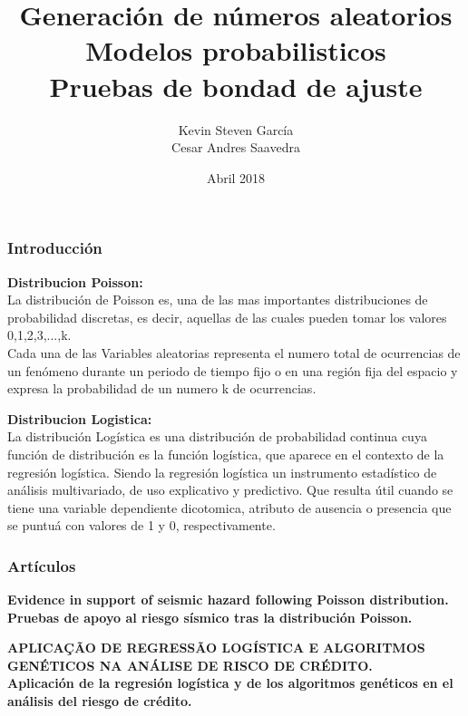 \documentclass[12pt]{beamer}
\author{Kevin Steven García \\ Cesar Andres Saavedra}
\title{Generación de números aleatorios \\ Modelos probabilisticos \\ Pruebas de bondad de ajuste}
\institute{Universdiad del Valle \\ Estadística \\ Simulación Estadística}
\date{Abril 2018}
\begin{document}
\begin{frame}
\titlepage
\end{frame}


\begin{frame}
\frametitle{Introducción}

\begin{block}{\textbf{Distribucion Poisson:} 
~\\La distribución de Poisson es, una de las mas importantes distribuciones de probabilidad discretas, es decir, aquellas de las cuales pueden tomar los valores 0,1,2,3,...,k.  
~\\Cada una de las Variables aleatorias representa el numero total de ocurrencias de un fenómeno durante un periodo de tiempo fijo o en una región fija del espacio y expresa la probabilidad de un numero k de ocurrencias.}
\end{block}
\end{frame}

\begin{frame}
\begin{block}{\textbf{Distribucion Logistica:}
~\\La distribución Logística es una distribución de probabilidad continua cuya función de distribución es la función logística, que aparece en el contexto de la regresión logística. Siendo la regresión logística un instrumento estadístico de análisis multivariado, de uso explicativo y predictivo. Que resulta útil cuando se tiene una variable dependiente dicotomica, atributo de ausencia o presencia que se puntuá con valores de 1 y 0, respectivamente.}
\end{block} 
\end{frame}

\begin{frame}
\frametitle{ Artículos}
\begin{itemize}
\begin{block}{\item\textbf{Evidence in support of seismic hazard following Poisson distribution.\\Pruebas de apoyo al riesgo sísmico tras la distribución Poisson.}}
\end{block} 
\end{itemize}

\begin{itemize}
\begin{block}{\item\textbf{APLICAÇÃO DE REGRESSÃO LOGÍSTICA E ALGORITMOS GENÉTICOS NA ANÁLISE DE RISCO DE CRÉDITO.\\Aplicación de la regresión logística y de los algoritmos genéticos en el análisis del riesgo de crédito.}}
\end{block} 
\end{itemize}
\end{frame}
\end{document}
